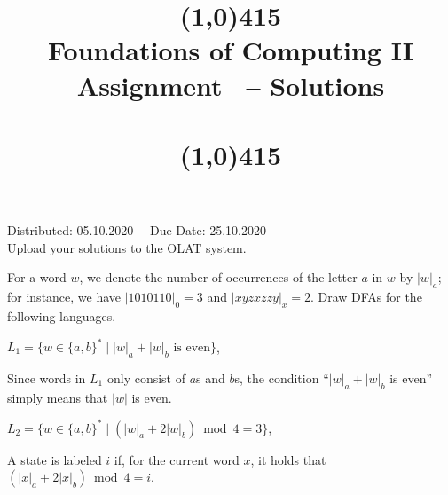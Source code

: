 \documentclass{exercise}
\title{\line(1,0){415}\\
  Foundations of Computing II\\
  \Large Assignment \theexercise\ -- Solutions\\[1em]
  \large{\topics}\\
  \line(1,0){415}}
\newcommand{\distdate}{05.10.2020}
\newcommand{\duedate}{25.10.2020}
\begin{document}
\maketitle

\begin{center}
  Distributed: \distdate\ -- Due Date: \duedate\\[1em]
  Upload your solutions to the OLAT system.\\[3em]
\end{center}


For a word $w$, we denote the number of occurrences of the letter $a$ in $w$ by $|w|_a$;
for instance, we have $|1010110|_0=3$ and $|xyzxzzy|_x=2$.  Draw DFAs for the following
languages.

\subtask $L_1=\{ w\in\{a,b\}^* \mid |w|_a + |w|_b \text { is even}\}$,

  \begin{solution}
    Since words in $L_1$ only consist of $a$s and $b$s, the condition ``$|w|_a + |w|_b$
    is even'' simply means that $|w|$ is even.
    \begin{center}
    \end{center}
  \end{solution}

\subtask $L_2=\{ w\in\{a,b\}^* \mid (|w|_a+2|w|_b)\bmod 4 = 3 \}$,
  
  \enlargethispage{0.9cm}
  \begin{solution}
    A state is labeled $i$ if, for the current word $x$, it holds that
    $(|x|_a+2|x|_b)\bmod 4 = i$.
    \begin{center}
    \end{center}
  \end{solution}
\end{document}
